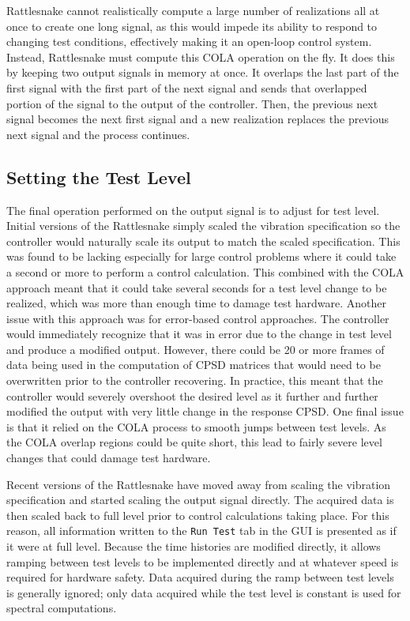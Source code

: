 \documentclass[pdf,12pt,report]{SANDreport}
\newcommand{\inlineCode}{\lstinline[basicstyle=\bfseries\ttfamily]}
\begin{document}
    Rattlesnake cannot realistically compute a large number of realizations all at once to create one long signal, as this would impede its ability to respond to changing test conditions, effectively making it an open-loop control system.  Instead, Rattlesnake must compute this \ac{COLA} operation on the fly.  It does this by keeping two output signals in memory at once.  It overlaps the last part of the first signal with the first part of the next signal and sends that overlapped portion of the signal to the output of the controller.  Then, the previous next signal becomes the next first signal and a new realization replaces the previous next signal and the process continues.
    
    \subsection{Setting the Test Level}
    The final operation performed on the output signal is to adjust for test level.  Initial versions of the Rattlesnake simply scaled the vibration specification so the controller would naturally scale its output to match the scaled specification.  This was found to be lacking especially for large control problems where it could take a second or more to perform a control calculation.  This combined with the \ac{COLA} approach meant that it could take several seconds for a test level change to be realized, which was more than enough time to damage test hardware.  Another issue with this approach was for error-based control approaches.  The controller would immediately recognize that it was in error due to the change in test level and produce a modified output.  However, there could be 20 or more frames of data being used in the computation of \ac{CPSD} matrices that would need to be overwritten prior to the controller recovering.  In practice, this meant that the controller would severely overshoot the desired level as it further and further modified the output with very little change in the response \ac{CPSD}.  One final issue is that it relied on the \ac{COLA} process to smooth jumps between test levels.  As the \ac{COLA} overlap regions could be quite short, this lead to fairly severe level changes that could damage test hardware.
    
    Recent versions of the Rattlesnake have moved away from scaling the vibration specification and started scaling the output signal directly.  The acquired data is then scaled back to full level prior to control calculations taking place.  For this reason, all information written to the \inlineCode{Run Test} tab in the \ac{GUI} is presented as if it were at full level.  Because the time histories are modified directly, it allows ramping between test levels to be implemented directly and at whatever speed is required for hardware safety.  Data acquired during the ramp between test levels is generally ignored; only data acquired while the test level is constant is used for spectral computations.
    
\end{document}

